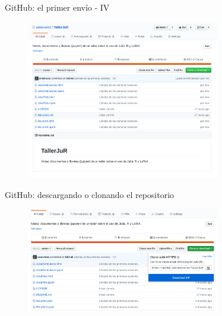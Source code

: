 \documentclass{beamer}
\begin{document}
\begin{frame}{GitHub: el primer env\'i{}o - IV}
  \begin{figure}[hp]
    \centering \includegraphics[width=0.75\textwidth]{fig/06The1stCommit}
    \label{fig:git1stciv}
  \end{figure}
\end{frame}

\begin{frame}{GitHub: descargando o clonando el repositorio}
  \begin{figure}[hp]
    \centering \includegraphics[width=0.75\textwidth]{fig/08Download}
    \label{fig:gitclone}
  \end{figure}
\end{frame}





\end{document}
